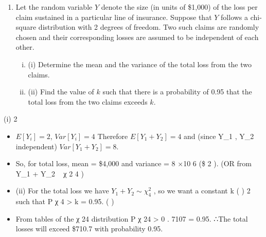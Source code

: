 \documentclass[a4paper,12pt]{article}
\begin{document}
\begin{enumerate}
\item 
Let the random variable $Y$ denote the size (in units of \$1,000) of the loss per claim sustained in a particular line of insurance. Suppose that $Y$ follows a chi-square distribution with 2 degrees of freedom. Two such claims are randomly chosen and
their corresponding losses are assumed to be independent of each other.
\begin{enumerate}[(i)]
\item (i) Determine the mean and the variance of the total loss from the two claims. 
\item (ii) Find the value of $k$ such that there is a probability of 0.95 that the total loss from the two claims exceeds $k$.
\end{enumerate}

\end{enumerate}
(i)
2
\begin{itemize}
\item $E [ Y_i ] = 2$, $Var [ Y_i ] = 4$
Therefore $E [ Y_1 + Y_2 ] = 4$ and (since Y_1 , Y_2 independent) $Var [ Y_1 + Y_2 ] = 8$.
\item So, for total loss, mean = \$4,000 and variance = 8 ×10 6 (\$ 2 ).
(OR from Y_1 + Y_2 ~ χ 2 4 )
\item (ii)
For the total loss we have $Y_1 + Y_2 \sim \chi^2_4$ , so we want a constant k
(
)
2
such that P χ 4 > k = 0.95.
(
)
\item From tables of the χ 24 distribution P χ 24 > 0 . 7107 = 0.95.
∴The total losses will exceed \$710.7 with probability 0.95.
\end{itemize}
\end{document}
